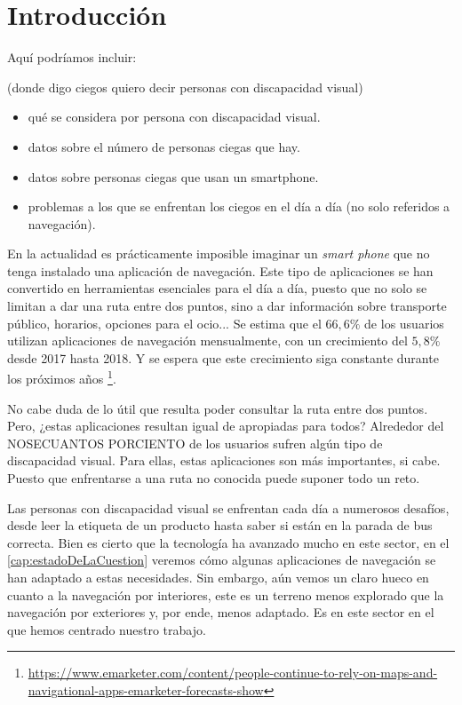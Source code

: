 \chapter{Introducción}
\label{cap:introduccion}


Aquí podríamos incluir:

(donde digo ciegos quiero decir personas con discapacidad visual)
\begin{itemize}

	\item qué se considera por persona con discapacidad visual.
	\item datos sobre el número de personas ciegas que hay.
	\item datos sobre personas ciegas que usan un smartphone.
	\item problemas a los que se enfrentan los ciegos en el día a día (no solo referidos a navegación).
	
\end{itemize}

En la actualidad es prácticamente imposible imaginar  un \textit{smart phone} que no tenga instalado una aplicación de navegación.
Este tipo de aplicaciones se han convertido en herramientas esenciales para el día a día, puesto que no solo se limitan a dar una ruta entre dos puntos, sino a dar información sobre transporte público, horarios, opciones para el ocio...
Se estima que el $66,6\%$ de los usuarios utilizan aplicaciones de navegación mensualmente, con un crecimiento del $5,8\%$ desde 2017 hasta 2018. Y se espera que este crecimiento siga constante durante los próximos años \footnote{\url{https://www.emarketer.com/content/people-continue-to-rely-on-maps-and-navigational-apps-emarketer-forecasts-show}}. 


No cabe duda de lo útil que resulta poder consultar la ruta entre dos puntos. Pero, ¿estas aplicaciones resultan igual de apropiadas para todos? Alrededor del NOSECUANTOS PORCIENTO de los usuarios sufren algún tipo de discapacidad visual. Para ellas, estas aplicaciones son más importantes, si cabe. Puesto que enfrentarse a una ruta no conocida puede suponer todo un reto. 

Las personas con discapacidad visual se enfrentan cada día a numerosos desafíos, desde leer la etiqueta de un producto hasta saber si están en la parada de bus correcta. Bien es cierto que la tecnología ha avanzado mucho en este sector, en el \autoref{cap:estadoDeLaCuestion} veremos cómo algunas aplicaciones de navegación se han adaptado a estas necesidades. Sin embargo, aún vemos un claro hueco en cuanto a la navegación por interiores, este es un terreno menos explorado que la navegación por exteriores y, por ende, menos adaptado. Es en este sector en el que hemos centrado nuestro trabajo. 


